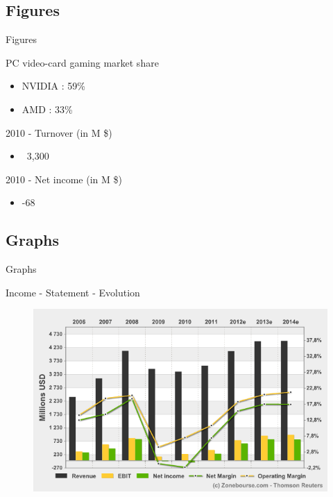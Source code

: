 \documentclass{beamer}
\begin{document}
\subsection{Figures}
\begin{frame}{Figures}
	\transdissolve[duration=0.1] %
	\begin{block}{PC video-card gaming market share}
		\begin{itemize}
			\item<+->{NVIDIA : 59\% }
			\item<+->{AMD : 33\% }
		\end{itemize}
	\end{block}	
	\pause
	\begin{block}{2010 - Turnover (in M \$)}
		\begin{itemize}
			\item<+->{~3,300}
		\end{itemize}
	\end{block}
	\pause
	\begin{block}{2010 - Net income (in M \$)}
		\begin{itemize}
			\item<+->{-68}
		\end{itemize}
	\end{block}
\end{frame}

\subsection{Graphs}
\begin{frame}{Graphs}
	\begin{block}{Income - Statement - Evolution}
		\begin{figure}[h]
			\includegraphics[width=0.90\textheight]{images/Income_Statement_Evolution.png}
		\end{figure}
	\end{block}	
\end{frame}
\end{document}

